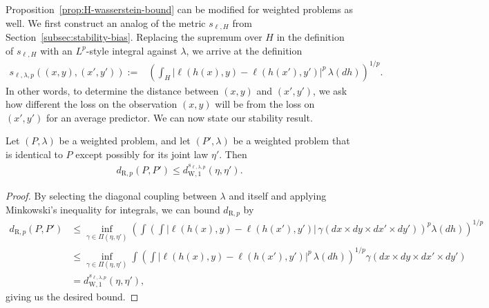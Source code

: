 \documentclass[twoside,11pt]{article}
\newcommand{\dexp}[1][]{d_{\mathrm{R}#1}}
\newcommand{\dWp}[1]{d_{\mathrm{W},#1}}
\newcommand{\dW}{\dWp 1}
\begin{document}
Proposition~\ref{prop:H-wasserstein-bound} can be modified for weighted problems as well. We first construct an analog of the metric $s_{\ell,H}$ from Section~\ref{subsec:stability-bias}. Replacing the supremum over $H$ in the definition of $s_{\ell,H}$ with an $L^p$-style integral against $\lambda$, we arrive at the definition
\begin{align*}
    s_{\ell,\lambda,p}((x,y),(x',y'))
    :=& \left(\int_H\big|\ell(h(x),y) - \ell(h(x'),y') \big |^p \, \lambda(dh) \right)^{1/p}.
\end{align*}
In other words, to determine the distance between $(x,y)$ and $(x',y')$, we ask how different the loss on the observation $(x,y)$ will be from the loss on $(x',y')$ for an average predictor.
We can now state our stability result.
\begin{proposition}\label{prop:H-wasserstein-bound-weighted}
    Let $(P,\lambda)$ be a weighted problem, and let $(P',\lambda)$ be a weighted problem that is identical to $P$ except possibly for its joint law $\eta'$. Then
    \begin{align*}
        \dexp[,p](P,P') \leq \dW^{s_{\ell,\lambda,p}}(\eta,\eta').
    \end{align*}
\end{proposition}
\begin{proof}
    By selecting the diagonal coupling between $\lambda$ and itself and applying Minkowski's inequality for integrals, we can bound $\dexp[,p]$ by
    \begin{align*}
        \dexp[,p](P,P') & \leq \inf_{\gamma \in \Pi(\eta,\eta')}
        \left(
            \int \left(
                \int \big |
                \ell(h(x),y) - \ell(h(x'),y')
                \big |
                \, \gamma(dx{\times}dy{\times}dx'{\times}dy')
            \right)^p
            \lambda(dh)
        \right)^{1/p}
        \\ &
        \leq 
        \inf_{\gamma \in \Pi(\eta,\eta')}
        \int \left(
            \int \big |
            \ell(h(x),y) - \ell(h(x'),y')
            \big |^p
            \, \lambda(dh)
        \right)^{1/p}
        \gamma(dx{\times}dy{\times}dx'{\times}dy')
        \\&
        = \dW^{s_{\ell,\lambda,p}}(\eta,\eta'), %
    \end{align*}
    giving us the desired bound.
\end{proof}
\end{document}
